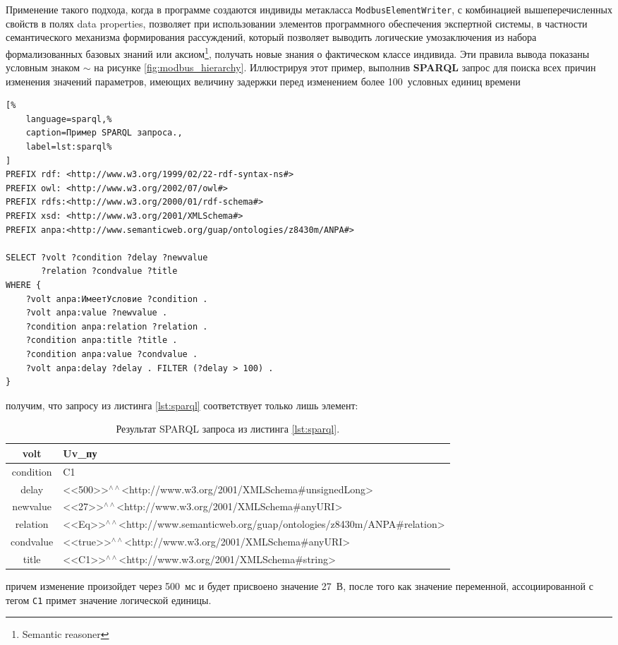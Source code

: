 Применение такого подхода, когда в программе \protege создаются индивиды метакласса \texttt{ModbusElementWriter},
с комбинацией вышеперечисленных свойств в полях data properties, позволяет при использовании элементов программного обеспечения экспертной системы,
в частности семантического механизма формирования рассуждений, который позволяет выводить логические умозаключения из набора формализованных базовых
знаний или аксиом\footnote{Semantic reasoner}, получать новые знания о фактическом классе индивида.
Эти правила вывода показаны условным знаком $\sim$ на рисунке \ref{fig:modbus_hierarchy}.
Иллюстрируя этот пример, выполнив \textbf{SPARQL} запрос для поиска всех причин изменения значений параметров,
имеющих величину задержки перед изменением более 100~условных единиц времени
\begin{lstlisting}[%
    language=sparql,%
    caption=Пример SPARQL запроса.,
    label=lst:sparql%
]
PREFIX rdf: <http://www.w3.org/1999/02/22-rdf-syntax-ns#>
PREFIX owl: <http://www.w3.org/2002/07/owl#>
PREFIX rdfs:<http://www.w3.org/2000/01/rdf-schema#>
PREFIX xsd: <http://www.w3.org/2001/XMLSchema#>
PREFIX anpa:<http://www.semanticweb.org/guap/ontologies/z8430m/ANPA#>

SELECT ?volt ?condition ?delay ?newvalue 
       ?relation ?condvalue ?title
WHERE {
    ?volt anpa:ИмеетУсловие ?condition .
    ?volt anpa:value ?newvalue .
    ?condition anpa:relation ?relation .
    ?condition anpa:title ?title .
    ?condition anpa:value ?condvalue .
    ?volt anpa:delay ?delay . FILTER (?delay > 100) .
}
\end{lstlisting}
получим, что запросу из листинга \ref{lst:sparql} соответствует только лишь элемент:
\begin{table}[ht!]
\begin{center}
    \caption{Результат SPARQL запроса из листинга \ref{lst:sparql}.}
    \begin{tabular}{|c|l|}\hline
        volt & Uv\_пу \\\hline
        condition & C1 \\\hline
        delay & <<500>>${}^{\wedge\wedge}$<http://www.w3.org/2001/XMLSchema\#unsignedLong> \\\hline
        newvalue & <<27>>${}^{\wedge\wedge}$<http://www.w3.org/2001/XMLSchema\#anyURI> \\\hline
        relation & {\small<<Eq>>${}^{\wedge\wedge}$<http://www.semanticweb.org/guap/ontologies/z8430m/ANPA\#relation>} \\\hline
        condvalue & <<true>>${}^{\wedge\wedge}$<http://www.w3.org/2001/XMLSchema\#anyURI> \\\hline
        title & <<C1>>${}^{\wedge\wedge}$<http://www.w3.org/2001/XMLSchema\#string> \\\hline
    \end{tabular}
\end{center}
\end{table}
причем изменение произойдет через 500~мс и будет присвоено значение 27~В, после того как значение переменной,
ассоциированной с тегом \texttt{C1} примет значение логической единицы.

